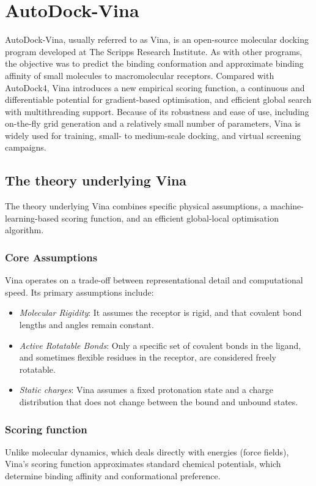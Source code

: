 \documentclass[12pt]{article}
\begin{document}
\section{AutoDock-Vina}

AutoDock-Vina, usually referred to as Vina, is an open-source molecular docking program developed at The Scripps Research Institute. As with other programs, the objective was to predict the binding conformation and approximate binding affinity of small molecules to macromolecular receptors\cite{CH7_trott2010vina}. Compared with AutoDock4, Vina introduces a new empirical scoring function, a continuous and differentiable potential for gradient-based optimisation, and efficient global search with multithreading support\cite{CH7_trott2010vina,CH7_forli2016autodock}. Because of its robustness and ease of use, including on-the-fly grid generation and a relatively small number of parameters, Vina is widely used for training, small- to medium-scale docking, and virtual screening campaigns.

\subsection{The theory underlying Vina}
The theory underlying Vina combines specific physical assumptions, a machine-learning-based scoring function, and an efficient global-local optimisation algorithm.

\subsubsection{Core Assumptions}
Vina operates on a trade-off between representational detail and computational speed. Its primary assumptions include:
\begin{itemize}
\item \emph{Molecular Rigidity}: It assumes the receptor is rigid, and that covalent bond lengths and angles remain constant.
\item \emph{Active Rotatable Bonds}: Only a specific set of covalent bonds in the ligand, and sometimes flexible residues in the receptor, are considered freely rotatable.
\item \emph{Static charges}: Vina assumes a fixed protonation state and a charge distribution that does not change between the bound and unbound states.
\end{itemize}

\subsubsection{Scoring function}
Unlike molecular dynamics, which deals directly with energies (force fields), Vina’s scoring function approximates standard chemical potentials, which determine binding affinity and conformational preference.
\end{document}
